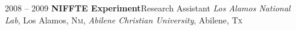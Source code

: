 \cventry
{2008 -- 2009}
{\textbf{NIFFTE Experiment}}{Research Assistant}
{
\newline\textit{Los Alamos National Lab}, Los Alamos, \textsc{Nm},
\newline\textit{Abilene Christian University}, Abilene, \textsc{Tx}
}{}{}

